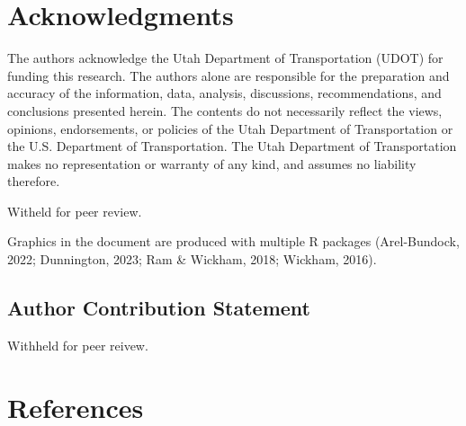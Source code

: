 \documentclass[
  letterpaper,
  number,
  review,
  doubleblind,
  3p]{elsarticle}
\begin{document}

\section*{Acknowledgments}\label{acknowledgments}


The authors acknowledge the Utah Department of Transportation (UDOT) for
funding this research. The authors alone are responsible for the
preparation and accuracy of the information, data, analysis,
discussions, recommendations, and conclusions presented herein. The
contents do not necessarily reflect the views, opinions, endorsements,
or policies of the Utah Department of Transportation or the U.S.
Department of Transportation. The Utah Department of Transportation
makes no representation or warranty of any kind, and assumes no
liability therefore.

Witheld for peer review.

Graphics in the document are produced with multiple R packages
(Arel-Bundock, 2022; Dunnington, 2023; Ram \& Wickham, 2018; Wickham,
2016).

\subsection*{Author Contribution Statement}\label{author-contribution-statement}


Withheld for peer reivew.


\section*{References}\label{references}

\end{document}
